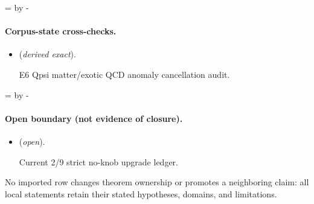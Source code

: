 \documentclass[11pt]{article}
\begin{document}
\par\begingroup{}=\pagegoal\advance{} by -\pagetotal\ifdim\dimen0<7\baselineskip\newpage\fi\endgroup
\paragraph{Corpus-state cross-checks.}
\begin{itemize}
\setlength{\itemsep}{0.25em}
\item {} (\emph{derived exact}).\par E6 Qpsi matter/exotic QCD anomaly cancellation audit.
\end{itemize}

\par\begingroup{}=\pagegoal\advance{} by -\pagetotal\ifdim\dimen0<7\baselineskip\newpage\fi\endgroup
\paragraph{Open boundary (not evidence of closure).}
\begin{itemize}
\setlength{\itemsep}{0.25em}
\item {} (\emph{open}).\par Current 2/9 strict no-knob upgrade ledger.
\end{itemize}

No imported row changes theorem ownership or promotes a neighboring claim: all local statements retain their stated hypotheses, domains, and limitations.
\end{document}
